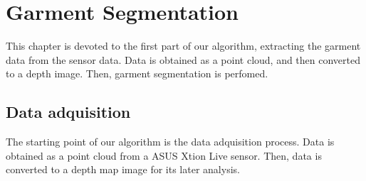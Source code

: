 \chapter{Garment Segmentation}

This chapter is devoted to the first part of our algorithm, extracting the garment data from the sensor data. Data is obtained as a point cloud, and then converted to a depth image. Then, garment segmentation is perfomed.

\section{Data adquisition}
The starting point of our algorithm is the data adquisition process. Data is obtained as a point cloud from a ASUS Xtion Live sensor. Then, data is converted to a depth map image for its later analysis. 